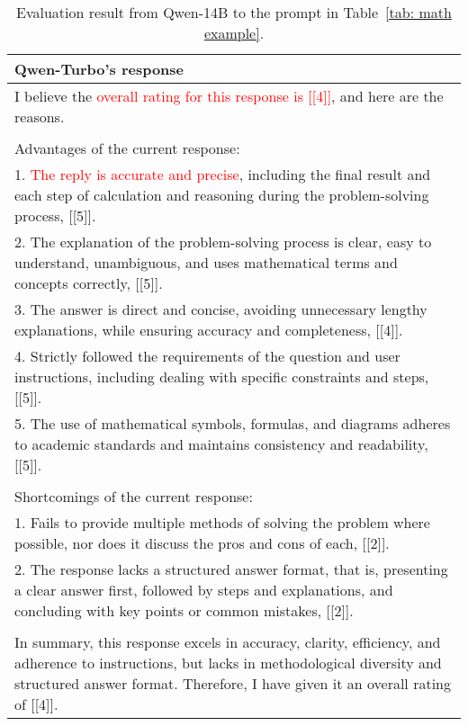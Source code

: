 \begin{table*}[tbh!]
  \caption{Evaluation result from Qwen-14B to the prompt in Table~\ref{tab: math example}.}
  \label{tab: qwenturbo's response}
  \small
  \begin{tabularx}{\textwidth}{X}
    \toprule
        Qwen-Turbo's response \\ \midrule
        I believe the \textcolor{red}{overall rating for this response is [[4]]}, and here are the reasons.\\
        \\
        Advantages of the current response:\\
        1. \textcolor{red}{The reply is accurate and precise}, including the final result and each step of calculation and reasoning during the problem-solving process, [[5]].\\
        2. The explanation of the problem-solving process is clear, easy to understand, unambiguous, and uses mathematical terms and concepts correctly, [[5]].\\
        3. The answer is direct and concise, avoiding unnecessary lengthy explanations, while ensuring accuracy and completeness, [[4]].\\
        4. Strictly followed the requirements of the question and user instructions, including dealing with specific constraints and steps, [[5]].\\
        5. The use of mathematical symbols, formulas, and diagrams adheres to academic standards and maintains consistency and readability, [[5]].\\
        \\
        Shortcomings of the current response:\\
        1. Fails to provide multiple methods of solving the problem where possible, nor does it discuss the pros and cons of each, [[2]].\\
        2. The response lacks a structured answer format, that is, presenting a clear answer first, followed by steps and explanations, and concluding with key points or common mistakes, [[2]].\\
        \\
        In summary, this response excels in accuracy, clarity, efficiency, and adherence to instructions, but lacks in methodological diversity and structured answer format. Therefore, I have given it an overall rating of [[4]].\\
    \bottomrule
  \end{tabularx}
\end{table*}




